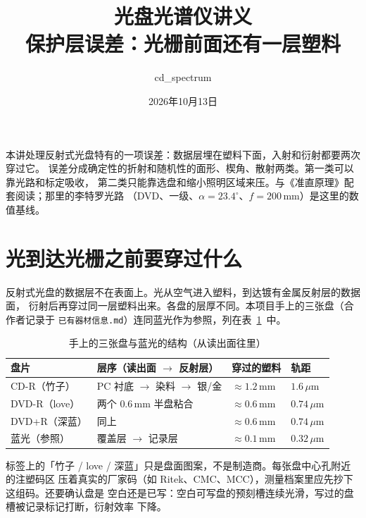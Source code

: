 \documentclass[a4paper,11pt]{ctexart}
\title{\bfseries 光盘光谱仪讲义\\[0.55em]
\large 保护层误差：光栅前面还有一层塑料}
\author{cd\_spectrum}
\date{2026年10月13日}
\begin{document}
\maketitle
\thispagestyle{empty}
\begin{center}
\parbox{0.92\textwidth}{\footnotesize
本讲处理反射式光盘特有的一项误差：数据层埋在塑料下面，入射和衍射都要两次穿过它。
误差分成确定性的折射和随机性的面形、楔角、散射两类。第一类可以靠光路和标定吸收，
第二类只能靠选盘和缩小照明区域来压。与《准直原理》配套阅读；那里的李特罗光路
（DVD、一级、$\alpha=23.4^\circ$、$f=200\,\mathrm{mm}$）是这里的数值基线。}
\end{center}
\vspace{0.6em}
\tableofcontents
\vspace{0.8em}

\section{光到达光栅之前要穿过什么}
\label{sec:stack}

反射式光盘的数据层不在表面上。光从空气进入塑料，到达镀有金属反射层的数据面，
衍射后再穿过同一层塑料出来。各盘的层厚不同。本项目手上的三张盘（合作者记录于
\texttt{已有器材信息.md}）连同蓝光作为参照，列在表~\ref{tab:layers}~中。

\begin{table}[htbp]
\centering\small
\caption{手上的三张盘与蓝光的结构（从读出面往里）}
\label{tab:layers}
\begin{tabular}{llll}
\toprule
盘片 & 层序（读出面 $\to$ 反射层） & 穿过的塑料 & 轨距 \\
\midrule
CD-R（竹子） & PC 衬底 $\to$ 染料 $\to$ 银/金 & $\approx 1.2\,\mathrm{mm}$ & $1.6\,\mu\mathrm{m}$ \\
DVD-R（love） & 两个 $0.6\,\mathrm{mm}$ 半盘粘合 & $\approx 0.6\,\mathrm{mm}$ & $0.74\,\mu\mathrm{m}$ \\
DVD+R（深蓝） & 同上 & $\approx 0.6\,\mathrm{mm}$ & $0.74\,\mu\mathrm{m}$ \\
蓝光（参照） & 覆盖层 $\to$ 记录层 & $\approx 0.1\,\mathrm{mm}$ & $0.32\,\mu\mathrm{m}$ \\
\bottomrule
\end{tabular}
\end{table}

标签上的「竹子 / love / 深蓝」只是盘面图案，不是制造商。每张盘中心孔附近的注塑码区
压着真实的厂家码（如 Ritek、CMC、MCC），测量档案里应先抄下这组码。还要确认盘是
空白还是已写：空白可写盘的预刻槽连续光滑，写过的盘槽被记录标记打断，衍射效率
下降。
\end{document}
